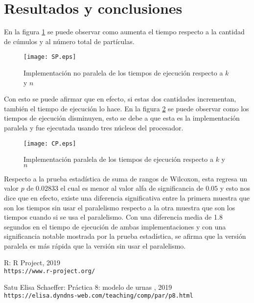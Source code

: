 \documentclass{article}
\begin{document}
\section{Resultados y conclusiones}
En la figura \ref{g1} se puede observar como aumenta el tiempo respecto a la cantidad de cúmulos y al número total de partículas.
\begin{figure}[H]
\centering
\texttt{[image: SP.eps]}
\caption{Implementación no paralela de los tiempos de ejecución respecto a $k$ y $n$}
\label{g1}
\end{figure}
Con esto se puede afirmar que en efecto, si estas dos cantidades incrementan, también el tiempo de ejecución lo hace. 
En la figura \ref{g2} se puede observar como los tiempos de ejecución disminuyen, esto se debe a que esta es la implementación paralela y fue ejecutada usando tres núcleos del procesador.
\begin{figure}[H]
\centering
\texttt{[image: CP.eps]}
\caption{Implementación paralela de los tiempos de ejecución respecto a $k$ y $n$}
\label{g2}
\end{figure}
Respecto a la prueba estadística de suma de rangos de Wilcoxon, esta regresa un valor $p$ de $0.02833$ el cual es menor al valor alfa de significancia de $0.05$ y esto nos dice que en efecto, existe una diferencia significativa entre la primera muestra que son los tiempos sin usar el paralelismo respecto a la otra muestra que son los tiempos cuando si se usa el paralelismo.
Con una diferencia media de 1.8 segundos en el tiempo de ejecución de ambas implementaciones y con una significancia notable mostrada por la prueba estadística, se afirma que la versión paralela es más rápida que la versión sin usar el paralelismo.












\begin{thebibliography}{9}

R:  R Project, 2019
\\\texttt{https://www.r-project.org/}

Satu Elisa Schaeffer: Práctica 8: modelo de urnas , 2019
\\\texttt{https://elisa.dyndns-web.com/teaching/comp/par/p8.html}



\end{thebibliography}
\end{document}
